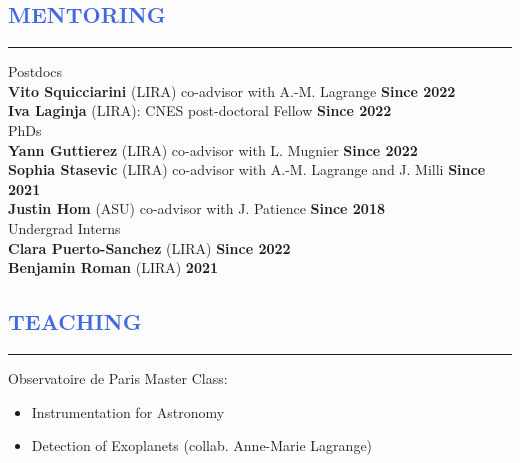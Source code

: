 \documentclass[11pt]{article}
\begin{document}
\vspace{-0.35cm}
\textcolor{RoyalBlue}{\section{\large MENTORING}
\vspace{-0.35cm}\hrule}
\vspace{0.4cm}
Postdocs\\
{\small
\textbf{Vito Squicciarini} (LIRA) co-advisor with A.-M. Lagrange \hfill \textbf{Since 2022}\\
\textbf{Iva Laginja} (LIRA): CNES post-doctoral Fellow \hfill \textbf{Since 2022}\\
}
PhDs\\
{\small
\textbf{Yann Guttierez} (LIRA) co-advisor with L. Mugnier \hfill \textbf{Since 2022}\\
\textbf{Sophia Stasevic} (LIRA) co-advisor with A.-M. Lagrange and J. Milli \hfill \textbf{Since 2021}\\
\textbf{Justin Hom} (ASU) co-advisor with J. Patience \hfill \textbf{Since 2018}\\
}
Undergrad Interns\\
{\small
\textbf{Clara Puerto-Sanchez} (LIRA) \hfill \textbf{Since 2022}\\
\textbf{Benjamin Roman} (LIRA) \hfill \textbf{2021}\\
}

\vspace{-0.1cm}
\textcolor{RoyalBlue}{\section{\large TEACHING}
\vspace{-0.35cm}\hrule}
\vspace{0.4cm}
Observatoire de Paris Master Class: 
\begin{itemize} \itemsep -2pt
    \item Instrumentation for Astronomy 
    \item Detection of Exoplanets (collab. Anne-Marie Lagrange)
\end{itemize}



\end{document}
